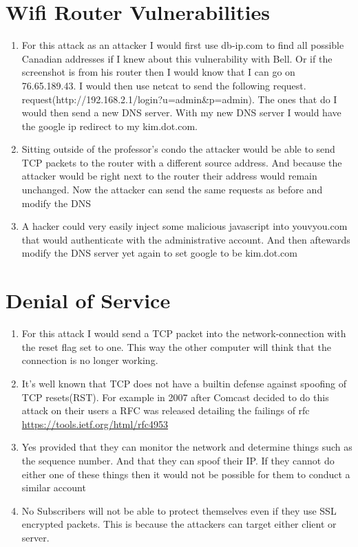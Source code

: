 \documentclass{article}
\begin{document}
\section{Wifi Router Vulnerabilities}
\begin{enumerate}[A]
	\item
		For this attack as an attacker I would first use db-ip.com to find all
		possible Canadian addresses if I knew about this vulnerability with
		Bell. Or if the screenshot is from his router then I would know that I
		can go on 76.65.189.43. 
		I would then use netcat to send the following request.
		request(http://192.168.2.1/login?u=admin&p=admin). The ones that do I
		would then send a new DNS server. With my new DNS server I would have
		the google ip redirect to my kim.dot.com.
	\item
		Sitting outside of the professor's condo the attacker would be able to
		send TCP packets to the router with a different source address. And
		because the attacker would be right next to the router their address
		would remain unchanged. Now the attacker can send the same requests as
		before and modify the DNS 
	\item
		A hacker could very easily inject some malicious javascript into
		youvyou.com that would authenticate with the administrative account. And
		then aftewards modify the DNS server yet again to set google to be
		kim.dot.com
\end{enumerate}

\section{Denial of Service}
\begin{enumerate}[A]
	\item
		For this attack I would send a TCP packet into the network-connection
		with the reset flag set to one. This way the other computer will think
		that the connection is no longer working.
	\item 
		It's well known that TCP does not have a builtin defense against
		spoofing of TCP resets(RST). For example in 2007 after Comcast decided
		to do this attack on their users a RFC was released detailing the
		failings of rfc \url{https://tools.ietf.org/html/rfc4953}
	\item
		Yes provided that they can monitor the network and determine things such
		as the sequence number. And that they can spoof their IP. If they cannot
		do either one of these things then it would not be possible for them to
		conduct a similar account
	\item
		No Subscribers will not be able to protect themselves even if they use
		SSL encrypted packets. This is because the attackers can target either
		client or server.
\end{enumerate}
\end{document}
